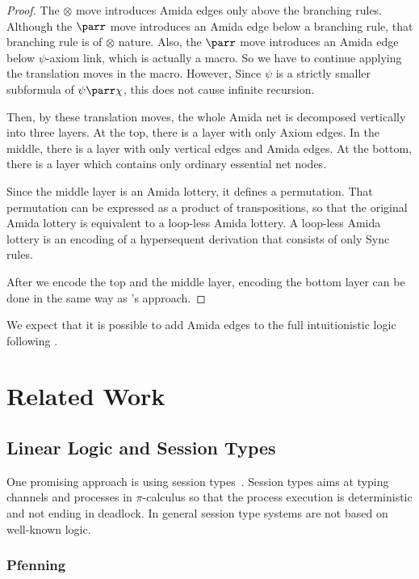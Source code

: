 \begin{proof}
The $\otimes$ move introduces Amida edges only above the branching rules.
Although the $\parr$ move introduces an Amida edge below a
branching rule, that branching rule is of $\otimes$ nature.
Also, the $\parr$ move introduces an Amida edge below $\psi$-axiom link,
which is actually a macro.  So we have to continue applying the
translation moves in the macro.  However, Since $\psi$ is a strictly
smaller subformula of $\psi\parr\chi$, this does not cause infinite
recursion.

Then, by these translation moves,
the whole Amida net is decomposed vertically into three layers.
At the top, there is a layer with only Axiom edges.
In the middle, there is a layer with only vertical edges and Amida
edges.
At the bottom, there is a layer which contains only ordinary
essential net nodes.

Since the middle layer is an Amida lottery, it defines a permutation.
That permutation can be expressed as a product of transpositions, so
that
the original Amida lottery is equivalent to a loop-less Amida lottery.
A loop-less Amida lottery is an encoding of a hypersequent derivation
that consists of only Sync rules.

After we encode the top and the middle layer, encoding the bottom layer
can be done in the same way as \citet{lamarche2008}'s approach.
 \end{proof}

We expect that it is possible to add Amida edges to
the full intuitionistic logic following
\citet{lamarche2008}.


\section{Related Work}

\subsection{Linear Logic and Session Types}

One promising approach is using session types~\citep{honda-session}.
Session types aims at typing channels and processes in $\pi$-calculus so
that the process execution is deterministic and not ending in deadlock.
In general session type systems are not based on well-known logic.

\subsubsection{Pfenning}

